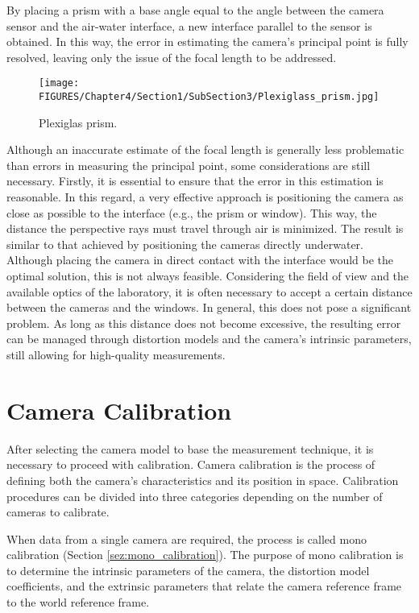 By placing a prism with a base angle equal to the angle between the camera sensor and the air-water interface, a new interface parallel to the sensor is obtained. In this way, the error in estimating the camera's principal point is fully resolved, leaving only the issue of the focal length to be addressed.

\begin{figure}[h!]
  \centering
  \texttt{[image: FIGURES/Chapter4/Section1/SubSection3/Plexiglass\_prism.jpg]}
  \caption{Plexiglas prism.}
  \label{fig:Plexiglass_prism}
\end{figure}

Although an inaccurate estimate of the focal length is generally less problematic than errors in measuring the principal point, some considerations are still necessary.
Firstly, it is essential to ensure that the error in this estimation is reasonable. In this regard, a very effective approach is positioning the camera as close as possible to the interface (e.g., the prism or window). This way, the distance the perspective rays must travel through air is minimized. The result is similar to that achieved by positioning the cameras directly underwater.
Although placing the camera in direct contact with the interface would be the optimal solution, this is not always feasible. Considering the field of view and the available optics of the laboratory, it is often necessary to accept a certain distance between the cameras and the windows. In general, this does not pose a significant problem. As long as this distance does not become excessive, the resulting error can be managed through distortion models and the camera’s intrinsic parameters, still allowing for high-quality measurements.

\section{Camera Calibration}
\label{sez:Camera_Calibration}

After selecting the camera model to base the measurement technique, it is necessary to proceed with calibration. Camera calibration is the process of defining both the camera's characteristics and its position in space.
Calibration procedures can be divided into three categories depending on the number of cameras to calibrate. 

When data from a single camera are required, the process is called mono calibration (Section \ref{sez:mono_calibration}). The purpose of mono calibration is to determine the intrinsic parameters of the camera, the distortion model coefficients, and the extrinsic parameters that relate the camera reference frame to the world reference frame.


